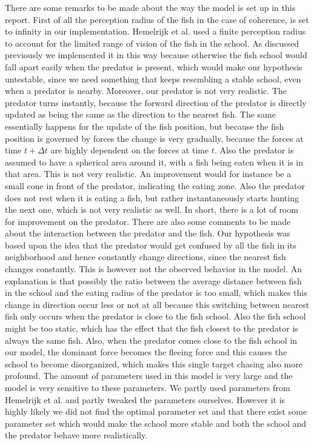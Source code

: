 \documentclass[11pt,a4paper]{article}
\begin{document}
There are some remarks to be made about the way the model is set up in this report. First of all the perception radius of the fish in the case of coherence, is set to infinity in our implementation. Hemelrijk et al. \cite{hemelrijk} used a finite perception radius to account for the limited range of vision of the fish in the school. As discussed previously we implemented it in this way because otherwise the fish school would fall apart easily when the predator is present, which would make our hypothesis untestable, since we need something that keeps resembling a stable school, even when a predator is nearby.
Moreover, our predator is not very realistic. The predator turns instantly, because the forward direction of the predator is directly updated as being the same as the direction to the nearest fish. The same essentially happens for the update of the fish position, but because the fish position is governed by forces the change is very gradually, because the forces at time $t+\Delta t$ are highly dependent on the forces at time $t$. Also the predator is assumed to have a spherical area around it, with a fish being eaten when it is in that area. This is not very realistic. An improvement would for instance be a small cone in front of the predator, indicating the eating zone. Also the predator does not rest when it is eating a fish, but rather instantaneously starts hunting the next one, which is not very realistic as well. In short, there is a lot of room for improvement on the predator.
There are also some comments to be made about the interaction between the predator and the fish. Our hypothesis was based upon the idea that the predator would get confused by all the fish in its neighborhood and hence constantly change directions, since the nearest fish changes constantly. This is however not the observed behavior in the model. An explanation is that possibly the ratio between the average distance between fish in the school and the eating radius of the predator is too small, which makes this change in direction occur less or not at all because this switching between nearest fish only occurs when the predator is close to the fish school. Also the fish school might be too static, which has the effect that the fish closest to the predator is always the same fish. Also, when the predator comes close to the fish school in our model, the dominant force becomes the fleeing force and this causes the school to become disorganized, which makes this single target chasing also more profound.
The amount of parameters used in this model is very large and the model is very sensitive to these parameters. We partly used parameters from Hemelrijk et al. \cite{hemelrijk} and partly tweaked the parameters ourselves. However it is highly likely we did not find the optimal parameter set and that there exist some parameter set which would make the school more stable and both the school and the predator behave more realistically.
\end{document}
